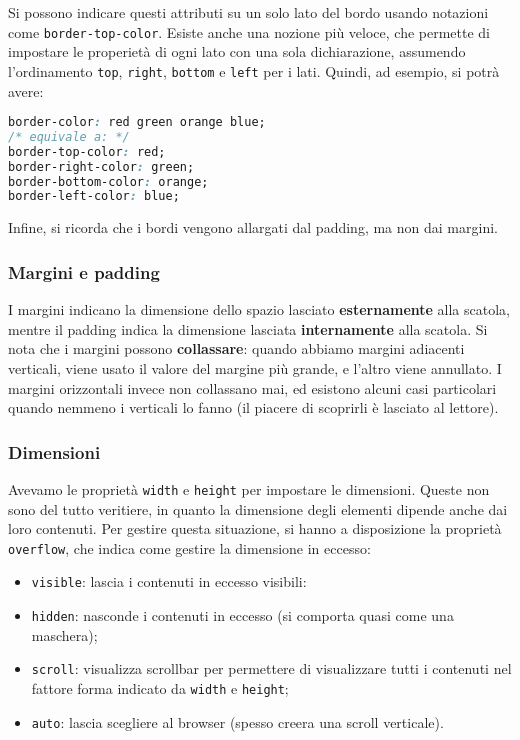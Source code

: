 \documentclass[a4paper,11pt]{article}
\begin{document}
Si possono indicare questi attributi su un solo lato del bordo usando notazioni come \lstinline|border-top-color|.
Esiste anche una nozione più veloce, che permette di impostare le properietà di ogni lato con una sola dichiarazione, assumendo l'ordinamento \lstinline|top|, \lstinline|right|, \lstinline|bottom| e \lstinline|left| per i lati.
Quindi, ad esempio, si potrà avere:
\begin{lstlisting}[language=css, style=codestyle]	
border-color: red green orange blue;
/* equivale a: */
border-top-color: red;
border-right-color: green;
border-bottom-color: orange;
border-left-color: blue;
\end{lstlisting}

Infine, si ricorda che i bordi vengono allargati dal padding, ma non dai margini.

\subsubsection{Margini e padding}
I margini indicano la dimensione dello spazio lasciato \textbf{esternamente} alla scatola, mentre il padding indica la dimensione lasciata \textbf{internamente} alla scatola.
Si nota che i margini possono \textbf{collassare}: quando abbiamo margini adiacenti verticali, viene usato il valore del margine più grande, e l'altro viene annullato.
I margini orizzontali invece non collassano mai, ed esistono alcuni casi particolari quando nemmeno i verticali lo fanno (il piacere di scoprirli è lasciato al lettore).

\subsubsection{Dimensioni}
Avevamo le proprietà \lstinline|width| e \lstinline|height| per impostare le dimensioni.
Queste non sono del tutto veritiere, in quanto la dimensione degli elementi dipende anche dai loro contenuti.
Per gestire questa situazione, si hanno a disposizione la proprietà \lstinline|overflow|, che indica come gestire la dimensione in eccesso: 
\begin{itemize}
	\item \lstinline|visible|: lascia i contenuti in eccesso visibili:
	\item \lstinline|hidden|: nasconde i contenuti in eccesso (si comporta quasi come una maschera);
	\item \lstinline|scroll|: visualizza scrollbar per permettere di visualizzare tutti i contenuti nel fattore forma indicato da \lstinline|width| e \lstinline|height|;
	\item \lstinline|auto|: lascia scegliere al browser (spesso creera una scroll verticale).
\end{itemize}
\end{document}
